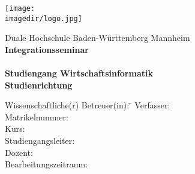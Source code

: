 \begin{titlepage}
\begin{minipage}{\textwidth}
		\vspace{-2cm}
		\noindent \hfill \texttt{[image: \\imagedir/logo.jpg]}
\end{minipage}
\vspace{1em}
\begin{center}
	{\textsf{\large Duale Hochschule Baden-W\"urttemberg Mannheim}}\\[4em]
	{\textsf{\textbf{Integrationsseminar}}}\\[6mm]
	{\textsf{\textbf{\Large{}\DerTitelDerArbeit}}} \\[1.5cm]
	{\textsf{\textbf{\large{}Studiengang Wirtschaftsinformatik}}\\[6mm]
	\textsf{\textbf{Studienrichtung \DieStudienrichtung}}}\vspace{15em}
	
	\begin{minipage}{\textwidth}
		\begin{tabbing}
		Wissenschaftliche(r) Betreuer(in): \hspace{0.85cm}\=\kill
		Verfasser: \> \DerAutorDerArbeit \\[1.5mm]
		Matrikelnummer: \> \DieMatrikelnummer \\[1.5mm]
		Kurs: \> \DieKursbezeichnung \\[1.5mm]
		Studiengangsleiter: \> \DerStudiengangsleiter \\[1.5mm]
		Dozent: \> \DerWissBetreuer \\[1.5mm]
		Bearbeitungszeitraum: \> \DerBearbeitungszeitraum\\[1.5mm]
		\end{tabbing}
	\end{minipage}
\end{center}
\end{titlepage}
